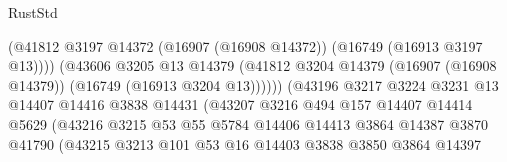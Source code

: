 \begin{lexlean}{RustStd}
\begin{coremodule}
                                            (@41812
                                              @3197
                                              @14372
                                              (@16907 (@16908 @14372))
                                              (@16749 (@16913 @3197 @13))))
                                          (@43606
                                            @3205
                                            @13
                                            @14379
                                            (@41812
                                              @3204
                                              @14379
                                              (@16907 (@16908 @14379))
                                              (@16749 (@16913 @3204 @13))))))
                                      (@43196
                                        @3217
                                        @3224
                                        @3231
                                        @13
                                        @14407
                                        @14416
                                        @3838
                                        @14431
                                        (@43207
                                          @3216
                                          @494
                                          @157
                                          @14407
                                          @14414
                                          @5629
                                          (@43216
                                            @3215
                                            @53
                                            @55
                                            @5784
                                            @14406
                                            @14413
                                            @3864
                                            @14387
                                            @3870
                                            @41790
                                            (@43215
                                              @3213
                                              @101
                                              @53
                                              @16
                                              @14403
                                              @3838
                                              @3850
                                              @3864
                                              @14397

\end{coremodule}
\end{lexlean}
